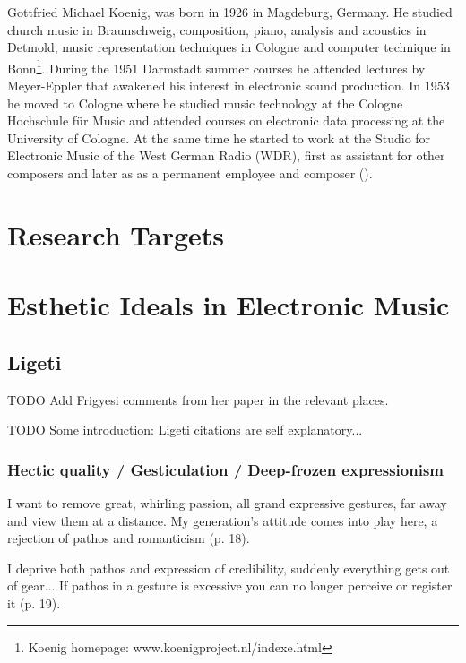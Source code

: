 \documentclass[a4paper,11pt]{article}
\begin{document}
Gottfried Michael Koenig, was born in 1926 in Magdeburg, Germany.
He studied church music in Braunschweig, composition, piano, analysis and acoustics in Detmold, music representation techniques in Cologne and computer technique in Bonn\footnote{Koenig homepage: www.koenigproject.nl/indexe.html}.
During the 1951 Darmstadt summer courses he attended lectures by Meyer-Eppler that awakened his interest in electronic sound production.
In 1953 he moved to Cologne where he studied music technology at the Cologne Hochschule f{\"u}r Music and attended courses on electronic data processing at the University of Cologne.
At the same time he started to work at the Studio for Electronic Music of the West German Radio (WDR), first as assistant for other composers and later as as a permanent employee and composer (\cite{koenig_grove}).

\section{Research Targets}  %
\label{sec:research_targets}

\section{Esthetic Ideals in Electronic Music}
\label{sec:esthetic_ideals_in_Electronic_music}

\subsection{Ligeti}
\label{sub:eshtetic_ligeti}

TODO Add Frigyesi comments from her paper in the relevant places.

TODO Some introduction: Ligeti citations are self explanatory...

\subsubsection{Hectic quality / Gesticulation / Deep-frozen expressionism}
\label{subs:ligeti:hectic}

I want to remove great, whirling passion, all grand expressive gestures, far away and view them at a distance.
My generation's attitude comes into play here, a rejection of pathos and romanticism (p. 18).

I deprive both pathos and expression of credibility, suddenly everything gets out of gear...
If pathos in a gesture is excessive you can no longer perceive or register it (p. 19).
\end{document}
